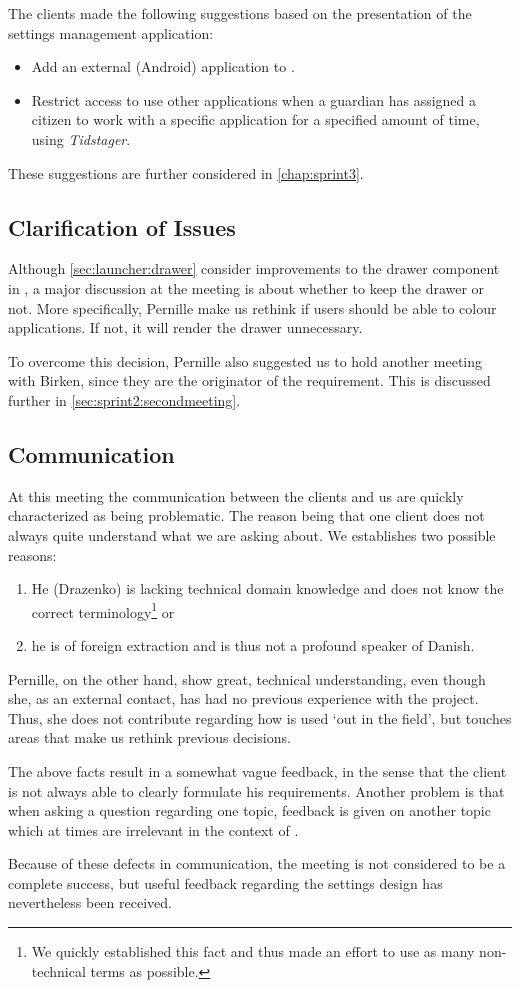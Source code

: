 The clients made the following suggestions based on the presentation of the settings management application:

\begin{itemize}
\item Add an external (Android) application to \launcher.
\item Restrict access to use other applications when a guardian has assigned a citizen to work with a specific application for a specified amount of time, using \textit{Tidstager}.
\end{itemize}

These suggestions are further considered in \cref{chap:sprint3}.

\subsection{Clarification of Issues}
Although \cref{sec:launcher:drawer} consider improvements to the drawer component in \giraf, a major discussion at the meeting is about whether to keep the drawer or not.
More specifically, Pernille make us rethink if users should be able to colour applications.
If not, it will render the drawer unnecessary.

To overcome this decision, Pernille also suggested us to hold another meeting with Birken, since they are the originator of the requirement.
This is discussed further in \cref{sec:sprint2:secondmeeting}.

\subsection{Communication}
At this meeting the communication between the clients and us are quickly characterized as being problematic.
The reason being that one client does not always quite understand what we are asking about.
We establishes two possible reasons:
\begin{enumerate}
\item He (Drazenko) is lacking technical domain knowledge and does not know the correct terminology\footnote{We quickly established this fact and thus made an effort to use as many non-technical terms as possible.} or
\item he is of foreign extraction and is thus not a profound speaker of Danish.
\end{enumerate}
Pernille, on the other hand, show great, technical understanding, even though she, as an external contact, has had no previous experience with the \giraf project.
Thus, she does not contribute regarding how \giraf is used `out in the field', but touches areas that make us rethink previous decisions.

The above facts result in a somewhat vague feedback, in the sense that the client is not always able to clearly formulate his requirements.
Another problem is that when asking a question regarding one topic, feedback is given on another topic which at times are irrelevant in the context of \launcher.

Because of these defects in communication, the meeting is not considered to be a complete success, but useful feedback regarding the settings design has nevertheless been received.